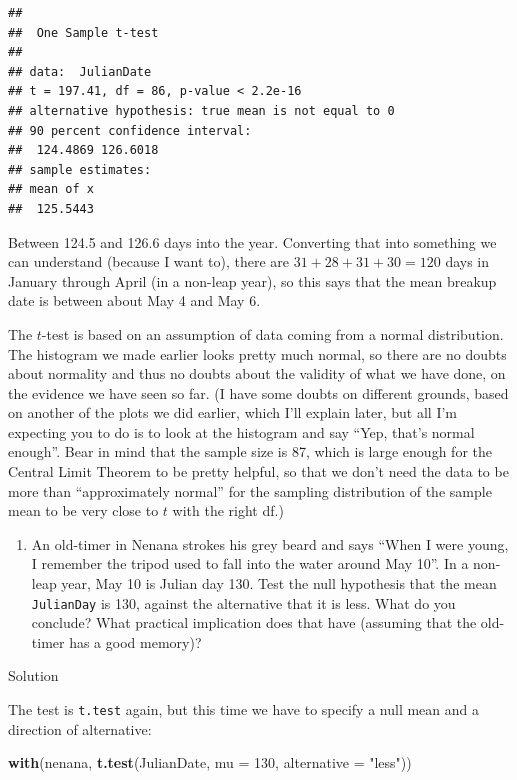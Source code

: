 \documentclass[]{tufte-book}
\newenvironment{Shaded}{}{}
\newcommand{\DataTypeTok}[1]{\textcolor[rgb]{0.56,0.13,0.00}{#1}}
\newcommand{\DecValTok}[1]{\textcolor[rgb]{0.25,0.63,0.44}{#1}}
\newcommand{\KeywordTok}[1]{\textcolor[rgb]{0.00,0.44,0.13}{\textbf{#1}}}
\newcommand{\NormalTok}[1]{#1}
\newcommand{\StringTok}[1]{\textcolor[rgb]{0.25,0.44,0.63}{#1}}
\providecommand{\tightlist}{%
  \setlength{\itemsep}{0pt}\setlength{\parskip}{0pt}}
\theoremstyle{definition}
\theoremstyle{definition}
\theoremstyle{definition}
\theoremstyle{remark}
\begin{document}
\begin{verbatim}
## 
##  One Sample t-test
## 
## data:  JulianDate
## t = 197.41, df = 86, p-value < 2.2e-16
## alternative hypothesis: true mean is not equal to 0
## 90 percent confidence interval:
##  124.4869 126.6018
## sample estimates:
## mean of x 
##  125.5443
\end{verbatim}

Between 124.5 and 126.6 days into the year. Converting that into
something we can understand (because I want to), there are
\(31+28+31+30=120\) days in January through April (in a non-leap year),
so this says that the mean breakup date is between about May 4 and May
6.

The \(t\)-test is based on an assumption of data coming from a normal
distribution. The histogram we made earlier looks pretty much normal, so
there are no doubts about normality and thus no doubts about the
validity of what we have done, on the evidence we have seen so far. (I
have some doubts on different grounds, based on another of the plots we
did earlier, which I'll explain later, but all I'm expecting you to do
is to look at the histogram and say ``Yep, that's normal enough''. Bear
in mind that the sample size is 87, which is large enough for the
Central Limit Theorem to be pretty helpful, so that we don't need the
data to be more than ``approximately normal'' for the sampling
distribution of the sample mean to be very close to \(t\) with the right
df.)

\begin{enumerate}
\def\labelenumi{(\alph{enumi})}
\setcounter{enumi}{2}
\tightlist
\item
  An old-timer in Nenana strokes his grey beard and says ``When I were
  young, I remember the tripod used to fall into the water around May
  10''. In a non-leap year, May 10 is Julian day 130. Test the null
  hypothesis that the mean \texttt{JulianDay} is 130, against the
  alternative that it is less. What do you conclude? What practical
  implication does that have (assuming that the old-timer has a good
  memory)?
\end{enumerate}

Solution

The test is \texttt{t.test} again, but this time we have to specify a
null mean and a direction of alternative:

\begin{Shaded}
\begin{Highlighting}[]
\KeywordTok{with}\NormalTok{(nenana, }\KeywordTok{t.test}\NormalTok{(JulianDate, }\DataTypeTok{mu =} \DecValTok{130}\NormalTok{, }\DataTypeTok{alternative =} \StringTok{"less"}\NormalTok{))}
\end{Highlighting}
\end{Shaded}
\end{document}
